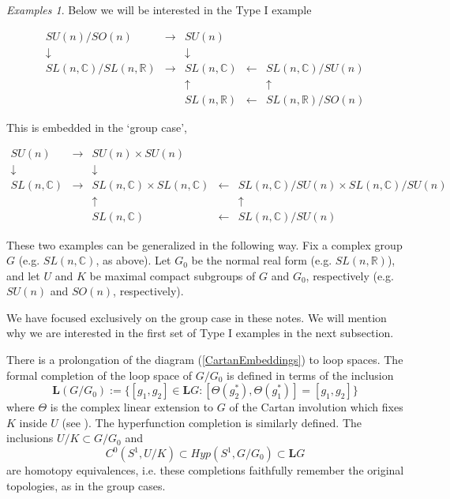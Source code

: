 \documentclass{amsart}
\theoremstyle{conjecture}
\theoremstyle{definition}
\theoremstyle{question}
\theoremstyle{questions}
\theoremstyle{remark}
\theoremstyle{remarks}
\theoremstyle{example}
\newtheorem*{example}{Examples}
\numberwithin{equation}{section}
\begin{document}
\begin{example}\label{symmetricspaces} Below we will be interested in the Type I example

\begin{equation}\label{CartanEmbedding1}
\begin{matrix}
SU(n)/SO(n) & \rightarrow & SU(n) & &  \\
\downarrow & & \downarrow & &\\
SL(n,\mathbb C)/SL(n,\mathbb R) & \rightarrow & SL(n,\mathbb C) & \leftarrow &SL(n,\mathbb C)/SU(n)  \\
 & &\uparrow & & \uparrow\\
& & SL(n,\mathbb R) &\leftarrow & SL(n,\mathbb R)/SO(n)  \end{matrix}
\end{equation}

This is embedded in the `group case',

\begin{equation}\label{CartanEmbedding2}
\begin{matrix}
SU(n) & \rightarrow & SU(n)\times SU(n) & &  \\
\downarrow & & \downarrow & &\\
SL(n,\mathbb C) & \rightarrow & SL(n,\mathbb C)\times SL(n,\mathbb C) & \leftarrow &SL(n,\mathbb C)/SU(n)\times SL(n,\mathbb C)/SU(n)  \\
 & &\uparrow & & \uparrow\\
& & SL(n,\mathbb C) &\leftarrow & SL(n,\mathbb C)/SU(n)  \end{matrix}
\end{equation}

These two examples can be generalized in the following way. Fix a complex group $G$ (e.g. $SL(n,\mathbb C)$, as above). Let $G_0$ be the
normal real form (e.g. $SL(n,\mathbb R)$), and let $U$ and $K$ be maximal compact subgroups of $G$ and $G_0$,
respectively (e.g. $SU(n)$ and $SO(n)$, respectively).

We have focused exclusively on the group case in these notes. We will mention why we are interested in the first set of Type I examples in the next subsection.
\end{example}


There is a prolongation of the diagram  (\ref{CartanEmbeddings}) to loop spaces. The formal completion of the loop space of $G/G_0$ is defined in terms of the inclusion
$$\mathbf L(G/G_0):=\{[g_1,g_2]\in \mathbf LG: [\Theta(g_2^*),\Theta(g_1^*)]=[g_1,g_2]\}$$
where $\Theta$ is the complex linear extension to $G$ of the Cartan involution which fixes $K$ inside $U$ (see \cite{Pi2}). The hyperfunction completion is similarly defined.
The inclusions $U/K \subset G/G_0$ and 
$$C^0(S^1,U/K) \subset Hyp(S^1,G/G_0)\subset \mathbf L G$$ 
are homotopy equivalences, i.e. these completions faithfully remember the original topologies, as in the group cases.
\end{document}
